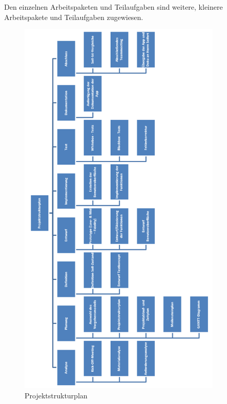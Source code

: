Den einzelnen Arbeitspaketen und Teilaufgaben sind weitere, kleinere Arbeitspakete und Teilaufgaben zugewiesen. 

\clearpage


\enlargethispage{3\baselineskip}

\begin{figure}[!h]
	\includegraphics[width=\textwidth,height=50em,keepaspectratio]{img/projektablaufplan-psp}
	\caption[Projektstrukturplan]{Projektstrukturplan\footnotemark}
\end{figure}

\clearpage


